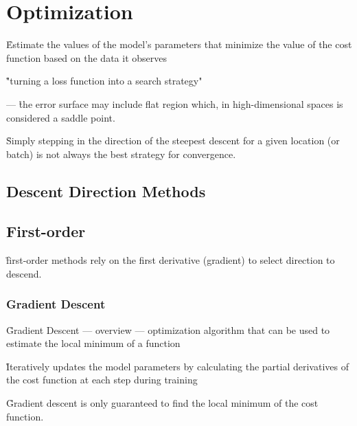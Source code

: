 \section{Optimization}
\label{subsec:optimization}


\r{Estimate the values of the model's parameters that minimize the value of the cost function based on the data it observes}

\r{"turning a loss function into a search strategy"}


 --- \r{the error surface may include flat region which, in high-dimensional spaces is considered a saddle point.}

\r{Simply stepping in the direction of the steepest descent for a given location (or batch) is not always the best strategy for convergence. }
\subsection{Descent Direction Methods}




\subsection{First-order}

\r{first-order methods rely on the first derivative (gradient) to select direction to descend.}

\subsubsection{Gradient Descent}

\r{Gradient Descent --- overview --- optimization algorithm that can be used to estimate the local minimum of a function}

\r{Iteratively updates the model parameters by calculating the partial derivatives of the cost function at each step during training}

\r{Gradient descent is only guaranteed to find the local minimum of the cost function.}

